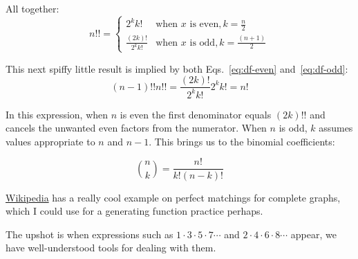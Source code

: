 \documentclass{article}
\begin{document}
All together:
\begin{equation}
n!! = \begin{cases}
  2^kk! & \text{when } x \text{ is even}, k = \frac{n}{2} \\
  \frac{(2k)!}{2^kk!} & \text{when } x \text{ is odd}, k = \frac{(n+1)}{2}
\end{cases}
\end{equation}


This next spiffy little result is implied by both
Eqs.~\ref{eq:df-even} and~\ref{eq:df-odd}:
\begin{equation}
  (n-1)!!n!! = \frac{(2k)!}{2^kk!}2^kk! = n!
\end{equation}

In this expression, when $n$ is even the first denominator equals $(2k)!!$
and cancels the unwanted even factors from the numerator. When $n$ is odd,
$k$ assumes values appropriate to $n$ and $n-1$. This brings us to the binomial
coefficients:

\[
  \binom{n}{k} = \frac{n!}{k!(n-k)!}
\]

\href{https://en.wikipedia.org/wiki/Double\_factorial}{Wikipedia} has a
really cool example on perfect matchings for complete graphs, which I could use
for a generating function practice perhaps.

The upshot is when expressions such as $1\cdot3\cdot5\cdot7\cdots$ and
$2\cdot4\cdot6\cdot8\cdots$ appear, we have well-understood tools for dealing
with them.




{}

\end{document}
